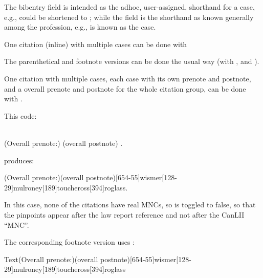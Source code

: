 \p The bibentry  field is intended as the adhoc, user-assigned, shorthand for a case, e.g.,  could be shortened to ; while the  field is the shorthand as known generally among the profession, e.g.,  is known as the  case.

\p One citation (inline) with multiple cases can be done with \\ 

The parenthetical and footnote versions can be done the usual way (with , and ).

\p One citation with multiple cases, each case with its own prenote and postnote, and a overall prenote and postnote for the whole citation group, can be done with .

This code:
\begin{magpar}
\begin{myquotation}
\noindent{} \\
 (Overall prenote:) (overall postnote)        .\\
 
\end{myquotation}
\end{magpar}
produces:
\begin{myquotation}\noindent
\togglefalse{pinpointaftermnc}
\lawcitesinline(Overall prenote:)(overall postnote)[654-55]{wismer}[128-29]{mulroney}[189]{toucheross}[394]{roglass}.
\toggletrue{pinpointaftermnc}
\end{myquotation}

In this case, none of the citations have real MNCs, so  is toggled to false, so that the pinpoints appear after the law report reference and not after the CanLII ``MNC''.

\p The corresponding footnote version uses :

\begin{myquotation}
\togglefalse{pinpointaftermnc}
Text\lawcitesfoot(Overall prenote:)(overall postnote)[654-55]{wismer}[128-29]{mulroney}[189]{toucheross}[394]{roglass}
\toggletrue{pinpointaftermnc}
\end{myquotation}

